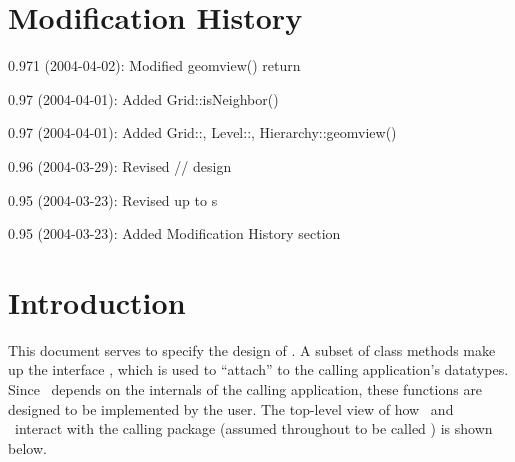 \documentclass[11pt]{article}
\begin{document}



\section{Modification History}

\BeginDESCRIPTION
\item[0.971 (2004-04-02):] Modified geomview() return
\item[0.97 (2004-04-01):] Added Grid::isNeighbor()
\item[0.97 (2004-04-01):] Added Grid::, Level::, Hierarchy::geomview()
\item[0.96 (2004-03-29):] Revised // design
\item[0.95 (2004-03-23):] Revised up to s
\item[0.95 (2004-03-23):] Added Modification History section
\EndDESCRIPTION

\section{Introduction}

This document serves to specify the design of \amrSolve.  A subset of
class methods make up the interface \amrLeech, which is used to
``attach'' to the calling application's datatypes.  Since \amrLeech\
depends on the internals of the calling application, these functions
are designed to be implemented by the user.  The top-level view of how
\amrSolve\ and \amrLeech\ interact with the calling package (assumed
throughout to be called \enzo) is shown below.

\end{document}
